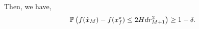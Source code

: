 \begin{proposition}
Then, we have, 
\begin{equation*}
\mathbb{P}\left(f(\hat{x}_M) - f(x_f^\star) \leq 2 Hd r_{M+1}^2\right)\geq 1-\delta. 
\end{equation*}
\end{proposition}

